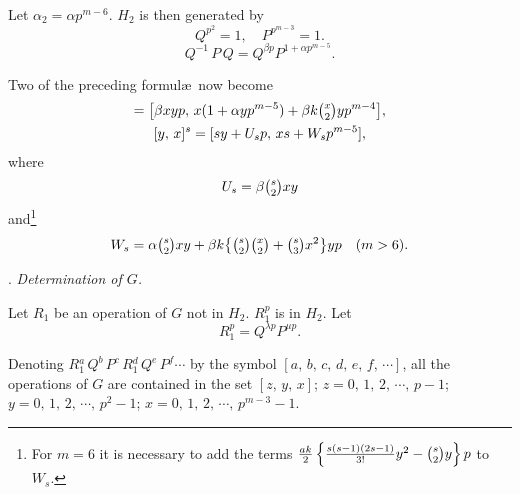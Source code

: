 \documentclass[oneside]{article}
\begin{document}
Let $\alpha_2 = \alpha p^{m-6}$. $H_2$ is then generated by
\begin{equation*}
Q^{p^2} = 1, \quad P^{p^{m-3}} = 1.
\end{equation*}
\begin{equation}
Q^{-1}\, P\, Q = Q^{\beta p} P^{1 + \alpha p^{m-5}}. %
\end{equation}

Two of the preceding formul\ae\ now become
\begin{gather}
[-y,\, x,\, y] = \bigl[\beta xyp,\, x(1 + \alpha yp^{m-5}) + \beta k\tbinom{x}{2}yp^{m-4}\bigr], \\ %
[y,\, x]^s = [sy + U_s p,\, xs + W_s p^{m-5}], %
\end{gather}
\noindent where
\begin{equation*}
U_s = \beta \tbinom{s}{2}xy
\end{equation*}
\noindent and\footnote{For $m = 6$ it is necessary to add the terms
$\frac{ak}{2} \left \{ \frac{s(s - 1)(2s - 1)}{3!}y^2 - \tbinom{s}{2}y \right \}p$
to $W_s$.}
\begin{equation*}
W_s = \alpha \tbinom{s}{2}xy + \beta k\bigl\{\tbinom{s}{2}\tbinom{x}{2}
  + \tbinom{s}{3}x^2\bigr\}yp \quad (m > 6).
\end{equation*}

. \textit{Determination of $G$.}

Let $R_1$ be an operation of $G$ not in $H_2$. $R{}_1^p$ is in $H_2$. Let
\begin{equation}
R{}_1^p = Q^{\lambda p} P^{\mu p}. %
\end{equation} %

Denoting $R{}_1^a\, Q^b\, P^c\, R{}_1^d\, Q^e\, P^f \cdots$ by the symbol $[a,\, b,\, c,\,
d,\, e,\, f,\, \cdots]$, all the operations of $G$ are contained in the set $[z,\,
y,\, x]$; $z = 0,\, 1,\, 2,\, \cdots,\, p - 1$; $y = 0,\, 1,\, 2,\, \cdots,\, p^2 - 1$; $x = 0,\,
1,\, 2,\, \cdots,\, p^{m-3} - 1$.
\end{document}
